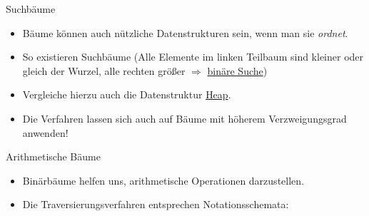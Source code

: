 \begin{frame}{Suchbäume}
    \begin{itemize}[<+(1)->]
        \widei
        \item Bäume können auch nützliche Datenstrukturen sein, wenn man sie \emph{ordnet}.
        \item So existieren Suchbäume (Alle Elemente im linken Teilbaum sind kleiner oder gleich der Wurzel, alle rechten größer \(\Rightarrow\) \hyperlink{mrk:binsearch}{binäre Suche})
        \item Vergleiche hierzu auch die Datenstruktur \hyperlink{mrk:Heap}{Heap}.
        \item Die Verfahren lassen sich auch auf Bäume mit höherem Verzweigungsgrad anwenden!
    \end{itemize}
\end{frame}

\begin{frame}{Arithmetische Bäume}
    \begin{itemize}[<+(1)->]
        \item Binärbäume helfen uns, arithmetische Operationen darzustellen.
    \end{itemize}
    \pause{}
    \begin{center}
    \end{center}
    \begin{itemize}[<+(1)->]
    \item Die Traversierungsverfahren entsprechen Notationsschemata: 
    \end{itemize}
\end{frame}

